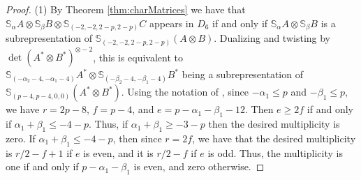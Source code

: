 \documentclass[11pt,reqno]{amsart}
\newcommand{\oo}{\otimes}
\newcommand{\bS}{\mathbb{S}}
\renewcommand{\det}{\operatorname{det}}
\numberwithin{equation}{section}
\begin{document}
\begin{proof}
(1) By Theorem \ref{thm:charMatrices} we have that $\bS_{\alpha}A\oo \bS_{\beta}B\oo \bS_{(-2,-2,2-p,2-p)}C$ appears in $D_6$ if and only if $\bS_{\alpha}A\oo \bS_{\beta}B$ is a subrepresentation of $\bS_{(-2,-2,2-p,2-p)}(A\oo B)$. Dualizing and twisting by $\det(A^{\ast}\oo B^{\ast})^{\otimes -2}$, this is equivalent to $\bS_{(-\alpha_2-4,-\alpha_1-4)}A^{\ast}\oo \bS_{(-\beta_2-4,-\beta_1-4)}B^{\ast}$ being a subrepresentation of $\bS_{(p-4,p-4,0,0)}(A^{\ast}\oo B^{\ast})$. Using the notation of \cite[Corollary 4.3b]{raicu2012secant}, since $-\alpha_1\leq p$ and $-\beta_1\leq p$, we have $r=2p-8$, $f=p-4$, and $e=p-\alpha_1-\beta_1-12$. Then $e\geq 2f$ if and only if $\alpha_1+\beta_1\leq -4-p$. Thus, if $\alpha_1+\beta_1\geq -3-p$ then the desired multiplicity is zero. If $\alpha_1+\beta_1\leq -4-p$, then since $r=2f$, we have that the desired multiplicity is $r/2-f+1$ if $e$ is even, and it is $r/2-f$ if $e$ is odd. Thus, the multiplicity is one if and only if $p-\alpha_1-\beta_1$ is even, and zero otherwise.





\end{proof}
\end{document}

